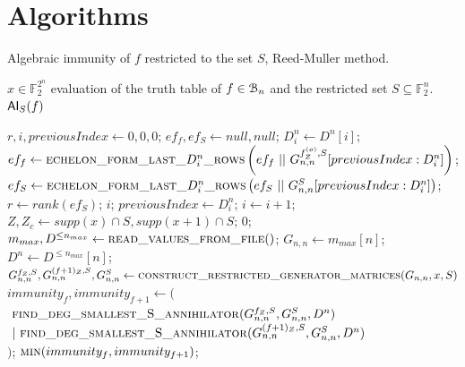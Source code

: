 \documentclass[11pt]{llncs}
\begin{document}
\section{Algorithms}\label{Appendix:algorithms}

\begin{algorithm}[H]
\small
	\caption{Algebraic immunity of $f$ restricted to the set $S$, Reed-Muller method.}\label{alg:RMApproach}
	\begin{algorithmic}[1]
		\Require $x\in \mathbb{F}_2^{2^n}$ evaluation of the truth table of $f\in \mathcal{B}_{n}$ and the restricted set $S\subseteq \mathbb{F}_2^n$.
		\Ensure $\mathsf{AI}_S(f)$
		
		\State $r,i, previousIndex\gets 0,0,0$;
		\State $ef_f, ef_S \gets null, null$;
		\State $D_i^n \gets D^n[i]$;
		\State $ef_f\gets \mbox{\textsc{echelon\_form\_last\_}}D_i^n\mbox{\textsc{\_rows}}\left(ef_f\ ||\  G_{n,n}^{f_Z^{(o)},S}[previousIndex:D_i^n]\right)$\footnotemark;
		\State $ef_S \gets \mbox{\textsc{echelon\_form\_last\_}}D_i^n\mbox{\textsc{\_rows}}\left(ef_S\ ||\ G_{n,n}^S[previousIndex:D_i^n]\right)$;
		\State $r \gets rank\left(ef_S\right)$;
		\State
		\Return $i$;
		\EndIf
		\State $previousIndex \gets D_i^n$;
		\State $i \gets i+1$;
		\EndWhile
		\EndFunction
        \State
        \State $Z , Z_c\gets supp(x)\cap S, supp(x+1) \cap S$;
		\Return $0$;
		\EndIf
		\State $m_{max}, D^{\leq n_{max}}\gets \mbox{\textsc{read\_values\_from\_file}}()$;
		\State $G_{n,n}\gets m_{max}[n]$;
		\State $D^n \gets D^{\leq n_{max}}[n]$;
        \State $G_{n,n}^{f_Z,S}, G_{n,n}^{(f+ 1)_Z,S}, G_{n,n}^S \gets \textsc{construct\_restricted\_generator\_matrices}(G_{n,n},x,S)$\footnotemark\;
		\State $immunity_f, immunity_{f+1} \leftarrow ($\\
		$\ \mbox{\textsc{find\_deg\_smallest\_S\_annihilator}}(G_{n,n}^{f_Z,S}, G_{n,n}^S,D^{n})$\\
		$\ |\ \mbox{\textsc{find\_deg\_smallest\_S\_annihilator}}(G_{n,n}^{(f+ 1)_Z,S}, G_{n,n}^S, D^{n})$\\
		$)$;
		\State \Return $\mbox{\textsc{min}}(immunity_f, immunity_{f+1})$\footnotemark;
	\end{algorithmic}
\end{algorithm}
\end{document}
